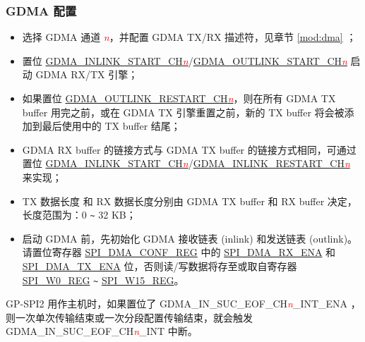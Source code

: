 \documentclass[main\_\_CN.tex]{subfiles}
\begin{document}
\subsubsection{GDMA 配置}\label{sec:DMA-conf}


\begin{itemize}
    \item 选择 GDMA 通道 \textcolor{red}{\it{n}}，并配置 GDMA TX/RX 描述符，见章节 \ref{mod:dma} \textit{}；
    
    \item 置位 \hyperref[fielddesc:GDMAINLINKSTARTCHN]{GDMA\_INLINK\_START\_CH\textcolor{red}{\it{n}}}/\hyperref[fielddesc:GDMAOUTLINKSTARTCHN]{GDMA\_OUTLINK\_START\_CH\textcolor{red}{\it{n}}}  启动 GDMA RX/TX 引擎；

    \item 如果置位 \hyperref[fielddesc:GDMAOUTLINKRESTARTCHN]{GDMA\_OUTLINK\_RESTART\_CH\textcolor{red}{\it{n}}}，则在所有 GDMA TX buffer 用完之前，或在 GDMA TX 引擎重置之前，新的 TX buffer 将会被添加到最后使用中的 TX buffer 结尾；
  
    \item GDMA RX buffer 的链接方式与 GDMA TX buffer 的链接方式相同，可通过置位 \hyperref[fielddesc:GDMAINLINKSTARTCHN]{GDMA\_INLINK\_START\_CH\textcolor{red}{\it{n}}}/\hyperref[fielddesc:GDMAINLINKRESTARTCHN]{GDMA\_INLINK\_RESTART\_CH\textcolor{red}{\it{n}}} 来实现；
  
    \item TX 数据长度 和 RX 数据长度分别由 GDMA TX buffer 和 RX buffer 决定，长度范围为：0 \verb+~+ 32 KB； 
  
    \item 启动 GDMA 前，先初始化 GDMA 接收链表 (inlink) 和发送链表 (outlink)。请置位寄存器 \hyperref[regdesc:SPIDMACONFREG]{SPI\_DMA\_CONF\_REG} 中的 \hyperref[fielddesc:SPIDMARXENA]{SPI\_DMA\_RX\_ENA} 和 \hyperref[fielddesc:SPIDMATXENA]{SPI\_DMA\_TX\_ENA} 位，否则读/写数据将存至或取自寄存器 \hyperref[regdesc:SPIW0REG]{SPI\_W0\_REG} \verb+~+ \hyperref[regdesc:SPIW0REG]{SPI\_W15\_REG}。
  
\end{itemize}

GP-SPI2 用作主机时，如果置位了 GDMA\_IN\_SUC\_EOF\_CH\textcolor{red}{\it{n}}\_INT\_ENA ，则一次单次传输结束或一次分段配置传输结束，就会触发 GDMA\_IN\_SUC\_EOF\_CH\textcolor{red}{\it{n}}\_INT  中断。
\end{document}
